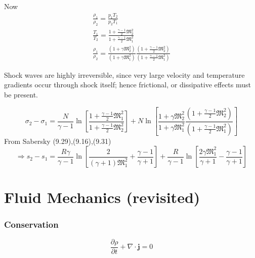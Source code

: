 \documentclass[twoside,landscape,10pt]{amsart}
\theoremstyle{plain}
\theoremstyle{definition}
\theoremstyle{remark}
\theoremstyle{remark}
\begin{document}
\begin{multicols*}{2}
Now
\[
\begin{gathered}
  \frac{\rho_1}{\rho_2} = \frac{p_1T_2}{p_2T_1} \\ 
  \frac{T_1}{T_2} = \frac{ 1 + \frac{\gamma-1}{2} \mathfrak{M}_2^2 }{ 1 + \frac{\gamma-1}{2} \mathfrak{M}_1^2 } \\
  \frac{\rho_1}{\rho_2} = \frac{(1+\gamma \mathfrak{M}_2^2 )}{ (1 + \gamma \mathfrak{M}_1^2 ) } \frac{ (1 + \frac{\gamma -1}{2} \mathfrak{M}_2^2 ) }{ (1 + \frac{\gamma-1}{2} \mathfrak{M}_1^2)}
\end{gathered}
\]


Shock waves are highly irreversible, since very large velocity and temperature gradients occur through shock itself; hence frictional, or dissipative effects must be present.\cite{SAHG1998}


\[
\sigma_2 - \sigma_1 = \frac{N}{\gamma -1} \ln{ \left[ \frac{1 + \frac{\gamma -1}{2} \mathfrak{M}_1^2 }{ 1 + \frac{\gamma-1}{2} \mathfrak{M}_2^2 } \right] } + N \ln{ \left[ \frac{1 + \gamma \mathfrak{M}_2^2 }{ 1 + \gamma \mathfrak{M}_1^2 } \frac{ ( 1 + \frac{\gamma -1}{2} \mathfrak{M}_2^2 ) }{ (1 + \frac{\gamma-1}{2} \mathfrak{M}_1^2) } \right] }
\]
From Sabersky (9.29),(9.16),(9.31) \cite{SAHG1998}
\[
\Longrightarrow s_2 - s_1 = \frac{R\gamma}{\gamma -1} \ln{ \left[ \frac{2}{(\gamma +1) \mathfrak{M}_1^2} + \frac{\gamma -1}{\gamma +1} \right] } + \frac{R}{\gamma -1} \ln{ \left[ \frac{2\gamma \mathfrak{M}_1^2 }{ \gamma +1 } - \frac{\gamma -1}{\gamma +1 } \right] }
\]



\part{Fluid Mechanics (revisited)}

\section{Conservation}

\begin{equation}
  \frac{ \partial \rho }{ \partial t } + \nabla \cdot \mathbf{j} = 0 
\end{equation}


\end{multicols*}
\end{document}
